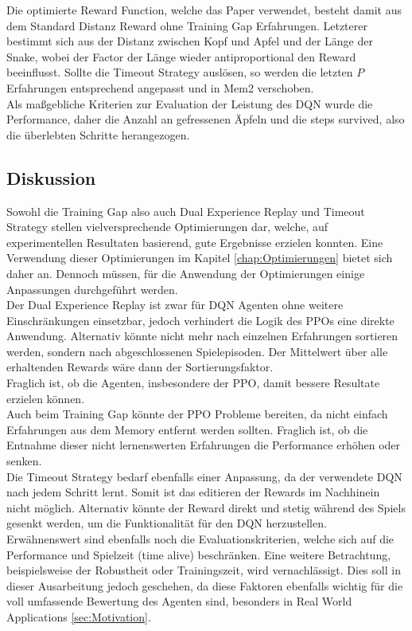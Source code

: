 Die optimierte Reward Function, welche das Paper verwendet, besteht damit aus dem Standard Distanz Reward ohne Training Gap Erfahrungen. Letzterer bestimmt sich aus der Distanz zwischen Kopf und Apfel und der Länge der Snake, wobei der Factor der Länge wieder antiproportional den Reward beeinflusst. Sollte die Timeout Strategy auslösen, so werden die letzten $P$ Erfahrungen entsprechend angepasst und in Mem2 verschoben.\\
Als maßgebliche Kriterien zur Evaluation der Leistung des DQN wurde die Performance, daher die Anzahl an gefressenen Äpfeln und die steps survived, also die überlebten Schritte herangezogen.

\subsection{Diskussion} \label{sec:Paper_1_Diskussion}
Sowohl die Training Gap also auch Dual Experience Replay und Timeout Strategy stellen vielversprechende Optimierungen dar, welche, auf experimentellen Resultaten basierend, gute Ergebnisse erzielen konnten. Eine Verwendung dieser Optimierungen im Kapitel \ref{chap:Optimierungen} bietet sich daher an. Dennoch müssen, für die Anwendung der Optimierungen einige Anpassungen durchgeführt werden.\\
Der Dual Experience Replay ist zwar für DQN Agenten ohne weitere Einschränkungen einsetzbar, jedoch verhindert die Logik des PPOs eine direkte Anwendung. Alternativ könnte nicht mehr nach einzelnen Erfahrungen sortieren werden, sondern nach abgeschlossenen Spielepisoden. Der Mittelwert über alle erhaltenden Rewards wäre dann der Sortierungsfaktor.\\
Fraglich ist, ob die Agenten, insbesondere der PPO, damit bessere Resultate erzielen können.\\
Auch beim Training Gap könnte der PPO Probleme bereiten, da nicht einfach Erfahrungen aus dem Memory entfernt werden sollten. Fraglich ist, ob die Entnahme dieser nicht lernenswerten Erfahrungen die Performance erhöhen oder senken.\\
Die Timeout Strategy bedarf ebenfalls einer Anpassung, da der verwendete DQN nach jedem Schritt lernt. Somit ist das editieren der Rewards im Nachhinein nicht möglich. Alternativ könnte der Reward direkt und stetig während des Spiels gesenkt werden, um die Funktionalität für den DQN herzustellen.\\
Erwähnenswert sind ebenfalls noch die Evaluationskriterien, welche sich auf die Performance und Spielzeit (time alive) beschränken. Eine weitere Betrachtung, beispielsweise der Robustheit oder Trainingszeit, wird vernachlässigt. Dies soll in dieser Ausarbeitung jedoch geschehen, da diese Faktoren ebenfalls wichtig für die voll umfassende Bewertung des Agenten sind, besonders in Real World Applications \ref{sec:Motivation}.


